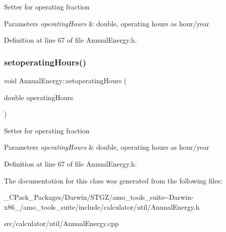 Setter for operating fraction


\begin{DoxyParams}{Parameters}
{\em operating\+Hours} & double, operating hours as hour/year \\
\hline
\end{DoxyParams}


Definition at line 67 of file Annual\+Energy.\+h.

\mbox{\label{class_annual_energy_a803812f06ca88aca8a02601930e870cf}} 
\subsubsection{\texorpdfstring{setoperating\+Hours()}{setoperatingHours()}\hspace{0.1cm}{\footnotesize\ttfamily [3/3]}}
{\footnotesize\ttfamily void Annual\+Energy\+::setoperating\+Hours (\begin{DoxyParamCaption}\item[{double}]{operating\+Hours }\end{DoxyParamCaption})\hspace{0.3cm}{\ttfamily [inline]}}

Setter for operating fraction


\begin{DoxyParams}{Parameters}
{\em operating\+Hours} & double, operating hours as hour/year \\
\hline
\end{DoxyParams}


Definition at line 67 of file Annual\+Energy.\+h.



The documentation for this class was generated from the following files\+:\begin{DoxyCompactItemize}
\item 
\+\_\+\+C\+Pack\+\_\+\+Packages/\+Darwin/\+S\+T\+G\+Z/amo\+\_\+tools\+\_\+suite-\/-\/\+Darwin-\/x86\+\_/amo\+\_\+tools\+\_\+suite/include/calculator/util/Annual\+Energy.\+h\item 
src/calculator/util/Annual\+Energy.\+cpp\end{DoxyCompactItemize}
